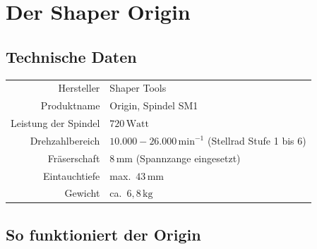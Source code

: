 \documentclass{\basedir/fablab-document}
\begin{document}

	\newpage


	\renewcommand{\contentsname}{Inhaltsverzeichnis / Arbeitsablauf}
	\setcounter{tocdepth}{2}
	\tableofcontents
	\newpage

	\section{Der Shaper Origin}

	\subsection{Technische Daten}

	\begin{center}
		\begin{tabular}{r|l}
			Hersteller & Shaper Tools \\
			Produktname & Origin, Spindel SM1 \\
			Leistung der Spindel & $720\,\mathrm{Watt}$ \\
			Drehzahlbereich & $10.000 - 26.000\,\mathrm{min}^{-1}$ (Stellrad Stufe 1 bis 6) \\
			Fräserschaft & $8\,\mathrm{mm}$ (Spannzange eingesetzt) \\
			Eintauchtiefe & max.\ $43\,\mathrm{mm}$ \\
			Gewicht & ca.\ $6{,}8\,\mathrm{kg}$ \\
		\end{tabular}
	\end{center}

	\subsection{So funktioniert der Origin}
\end{document}
